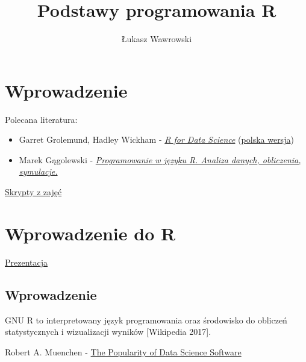 \documentclass[
]{book}
\title{Podstawy programowania R}
\author{Łukasz Wawrowski}
\date{}
\begin{document}
\maketitle

{
\setcounter{tocdepth}{1}
\tableofcontents
}
\hypertarget{wprowadzenie}{%
\chapter*{Wprowadzenie}\label{wprowadzenie}}

Polecana literatura:

\begin{itemize}
\item
  Garret Grolemund, Hadley Wickham - \href{http://r4ds.had.co.nz/}{\emph{R for Data Science}} (\href{https://helion.pl/ksiazki/jezyk-r-kompletny-zestaw-narzedzi-dla-analitykow-danych-hadley-wickham-garrett-grolemund,jezrko.htm}{polska wersja})
\item
  Marek Gągolewski - \href{http://www.gagolewski.com/publications/programowanier/}{\emph{Programowanie w języku R. Analiza danych, obliczenia, symulacje.}}
\end{itemize}

\href{https://github.com/lwawrowski/cdv_bigdata}{Skrypty z zajęć}

\hypertarget{wprowadzenie-do-r}{%
\chapter{Wprowadzenie do R}\label{wprowadzenie-do-r}}

\href{presentations/01_wprowadzenie.html}{Prezentacja}

\hypertarget{wprowadzenie-1}{%
\section{Wprowadzenie}\label{wprowadzenie-1}}

GNU R to interpretowany język programowania oraz środowisko do obliczeń statystycznych i wizualizacji wyników {[}Wikipedia 2017{]}.

Robert A. Muenchen - \href{http://r4stats.com/articles/popularity/}{The Popularity of Data Science Software}
\end{document}
